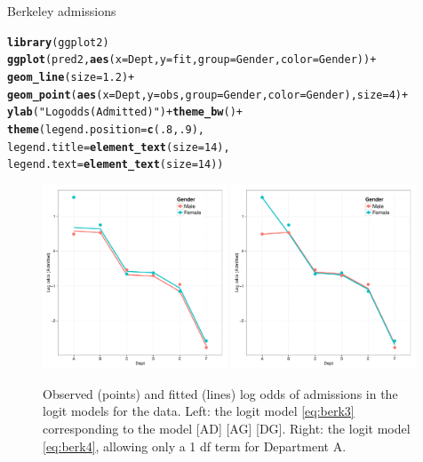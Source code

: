 \documentclass[11pt]{book}\usepackage[]{graphicx}\usepackage[]{color}
\makeatletter
\newcommand{\hlnum}[1]{\textcolor[rgb]{0.686,0.059,0.569}{#1}}%
\newcommand{\hlstr}[1]{\textcolor[rgb]{0.192,0.494,0.8}{#1}}%
\newcommand{\hlopt}[1]{\textcolor[rgb]{0,0,0}{#1}}%
\newcommand{\hlstd}[1]{\textcolor[rgb]{0.345,0.345,0.345}{#1}}%
\newcommand{\hlkwc}[1]{\textcolor[rgb]{0.333,0.667,0.333}{#1}}%
\newcommand{\hlkwd}[1]{\textcolor[rgb]{0.737,0.353,0.396}{\textbf{#1}}}%
\newenvironment{kframe}{%
 \def\at@end@of@kframe{}%
 \ifinner\ifhmode%
  \def\at@end@of@kframe{\end{minipage}}%
  \begin{minipage}{\columnwidth}%
 \fi\fi%
 \def\FrameCommand##1{\hskip\@totalleftmargin \hskip-\fboxsep
 \colorbox{shadecolor}{##1}\hskip-\fboxsep
     \hskip-\linewidth \hskip-\@totalleftmargin \hskip\columnwidth}%
 \MakeFramed {\advance\hsize-\width
   \@totalleftmargin\z@ \linewidth\hsize
   \@setminipage}}%
 {\par\unskip\endMakeFramed%
 \at@end@of@kframe}
\newenvironment{knitrout}{}{} %
\renewenvironment{knitrout}{\small\renewcommand{\baselinestretch}{.85}}{} %
\makeatother
\begin{document}
\begin{Example}[berkeley7]{Berkeley admissions}
\begin{knitrout}
\color{fgcolor}\begin{kframe}
\begin{alltt}
\hlkwd{library}\hlstd{(ggplot2)}
\hlkwd{ggplot}\hlstd{(pred2,} \hlkwd{aes}\hlstd{(}\hlkwc{x}\hlstd{=Dept,} \hlkwc{y}\hlstd{=fit,} \hlkwc{group}\hlstd{=Gender,} \hlkwc{color}\hlstd{=Gender))} \hlopt{+}
  \hlkwd{geom_line}\hlstd{(}\hlkwc{size}\hlstd{=}\hlnum{1.2}\hlstd{)} \hlopt{+}
  \hlkwd{geom_point}\hlstd{(}\hlkwd{aes}\hlstd{(}\hlkwc{x}\hlstd{=Dept,} \hlkwc{y}\hlstd{=obs,} \hlkwc{group}\hlstd{=Gender,} \hlkwc{color}\hlstd{=Gender),} \hlkwc{size}\hlstd{=}\hlnum{4}\hlstd{)} \hlopt{+}
  \hlkwd{ylab}\hlstd{(}\hlstr{"Log odds (Admitted)"}\hlstd{)} \hlopt{+} \hlkwd{theme_bw}\hlstd{()} \hlopt{+}
  \hlkwd{theme}\hlstd{(}\hlkwc{legend.position}\hlstd{=}\hlkwd{c}\hlstd{(}\hlnum{.8}\hlstd{,} \hlnum{.9}\hlstd{),}
        \hlkwc{legend.title}\hlstd{=}\hlkwd{element_text}\hlstd{(}\hlkwc{size}\hlstd{=}\hlnum{14}\hlstd{),}
        \hlkwc{legend.text}\hlstd{=}\hlkwd{element_text}\hlstd{(}\hlkwc{size}\hlstd{=}\hlnum{14}\hlstd{))}
\end{alltt}
\end{kframe}
\end{knitrout}


\begin{figure}[!htb]
\centering
\includegraphics[width=0.49\textwidth]{ch08/fig/berk-logit2}
\includegraphics[width=0.49\textwidth]{ch08/fig/berk-logit3}
\caption{Observed (points) and fitted (lines) log odds of admissions in the logit models for
the  data. Left: the logit model \eqref{eq:berk3} corresponding to the
\loglin model [AD] [AG] [DG]. Right: the logit model \eqref{eq:berk4}, allowing only a 1 df
term for Department A.}
\label{fig:berk-logit}
\end{figure}


\end{Example}
\end{document}
